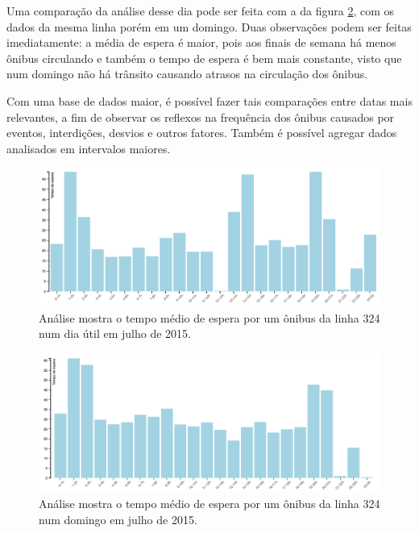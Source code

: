 Uma comparação da análise desse dia pode ser feita com a da figura \ref{fig:LABEL_FIG_ANALISE_FREQ_324_DOMINGO}, com os dados da mesma linha porém em um domingo. Duas observações podem ser feitas imediatamente: a média de espera é maior, pois aos finais de semana há menos ônibus circulando e também o tempo de espera é bem mais constante, visto que num domingo não há trânsito causando atrasos na circulação dos ônibus.

Com uma base de dados maior, é possível fazer tais comparações entre datas mais relevantes, a fim de observar os reflexos na frequência dos ônibus causados por eventos, interdições, desvios e outros fatores. Também é possível agregar dados analisados em intervalos maiores.

\begin{figure}
  \centering
  \includegraphics[width=1.0\textwidth]{imagens/grafico_freq.png}
  \caption{Análise mostra o tempo médio de espera por um ônibus da linha 324 num dia útil em julho de 2015.}
  \label{fig:LABEL_FIG_ANALISE_FREQ_324}
\end{figure}

\begin{figure}
  \centering
  \includegraphics[width=1.0\textwidth]{imagens/grafico_freq_dom.png}
  \caption{Análise mostra o tempo médio de espera por um ônibus da linha 324 num domingo em julho de 2015.}
  \label{fig:LABEL_FIG_ANALISE_FREQ_324_DOMINGO}
\end{figure}


